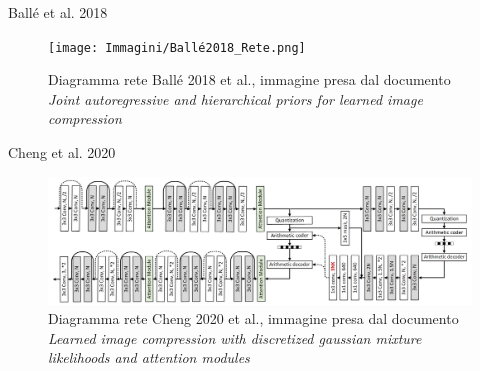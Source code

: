     \begin{frame}{Ballé et al\footnotemark[1]. 2018}
        \begin{figure}[!h]
            \centering
            \texttt{[image: Immagini/Ballé2018\_Rete.png]}
            \caption{Diagramma rete Ballé 2018 et al., immagine presa dal documento \textit{Joint autoregressive and hierarchical priors for learned image compression}\footnotemark[1]}
            \label{fig:balle2018Network}
        \end{figure}
    \end{frame}

    \begin{frame}{Cheng et al\footnotemark[1]. 2020}
        \begin{figure}[!h]
            \centering
            \includegraphics[width=1\textwidth]{Immagini/Cheng2020_Rete.png}
            \caption{Diagramma rete Cheng 2020 et al., immagine presa dal documento \textit{Learned image compression with discretized gaussian mixture likelihoods and attention modules}\footnotemark[1]}
            \label{fig:cheng2020Network}
        \end{figure}
    \end{frame}

